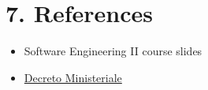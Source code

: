 \chapter{7. References}

\begin{itemize}
\item
  Software Engineering II course slides
\item
  \href{https://www.gazzettaufficiale.it/atto/vediPermalink?atto.dataPubblicazioneGazzetta=2020-11-09\&atto.codiceRedazionale=20G00170\&tipoSerie=serie_generale\&tipoVigenza=originario\&tipoProvvedimento=*}{Decreto Ministeriale}
\end{itemize}

